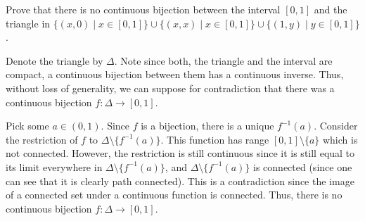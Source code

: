 \documentclass[12 pt, letterpaper]{hmcpset}
\begin{document}
\pagebreak

\begin{problem}[Problem 6]
	Prove that there is no continuous bijection between the interval $[0, 1]$ and the triangle in $\{ (x, 0) \mid x \in [0, 1] \} \cup \{ (x, x) \mid x \in [0, 1] \} \cup \{ (1, y) \mid y \in [0, 1] \}$.
\end{problem}

\begin{solution}
	Denote the triangle by $\Delta$. Note since both, the triangle and the interval are compact, a continuous bijection between them has a continuous inverse. Thus, without loss of generality, we can suppose for contradiction that there was a continuous bijection $f : \Delta \to [0, 1]$. 

	Pick some $a \in (0, 1)$. Since $f$ is a bijection, there is a unique $f^{-1}(a)$. Consider the restriction of $f$ to $\Delta \setminus \{ f^{-1}(a) \}$. This function has range $[0, 1] \setminus \{ a \}$ which is not connected. However, the restriction is still continuous since it is still equal to its limit everywhere in $\Delta \setminus \{ f^{-1}(a) \}$, and $\Delta \setminus \{ f^{-1}(a) \}$ is connected (since one can see that it is clearly path connected). This is a contradiction since the image of a connected set under a continuous function is connected. Thus, there is no continuous bijection $f : \Delta \to [0, 1]$.
\end{solution}
\end{document}
